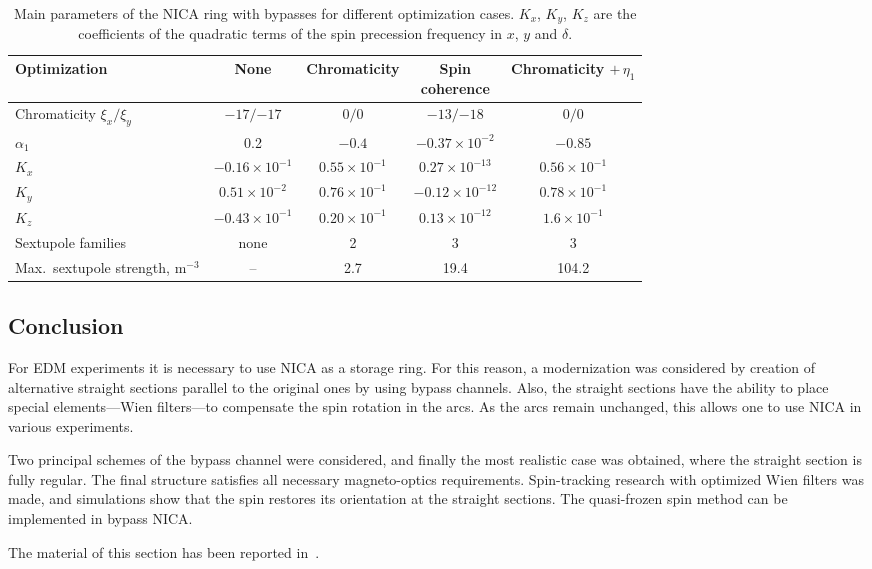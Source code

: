 \begin{table}[htbp]
  \centering
  \caption{Main parameters of the NICA ring with bypasses for different
    optimization cases. $K_x$, $K_y$, $K_z$ are the coefficients of the
    quadratic terms of the spin precession frequency in $x$, $y$ and $\delta$.}
  \label{tab:bypass_opt}
  \small
  \setlength{\tabcolsep}{3pt}
  \begin{tabular}{lcccc}
    \toprule
    Optimization & None & Chromaticity & \makecell{Spin\\coherence}
      & \makecell{Chromaticity\\$+\,\eta_1$} \\
    \midrule
    Chromaticity $\xi_x/\xi_y$ & $-17/{-17}$ & $0/0$ & $-13/{-18}$ & $0/0$ \\
    $\alpha_1$ & 0.2 & $-0.4$ & $-0.37\times10^{-2}$ & $-0.85$ \\
    $K_x$ & $-0.16\times10^{-1}$ & $0.55\times10^{-1}$ & $0.27\times10^{-13}$ & $0.56\times10^{-1}$ \\
    $K_y$ & $0.51\times10^{-2}$ & $0.76\times10^{-1}$ & $-0.12\times10^{-12}$ & $0.78\times10^{-1}$ \\
    $K_z$ & $-0.43\times10^{-1}$ & $0.20\times10^{-1}$ & $0.13\times10^{-12}$ & $1.6\times10^{-1}$ \\
    Sextupole families & none & 2 & 3 & 3 \\
    \makecell[l]{Max.\ sextupole\\strength, m$^{-3}$} & -- & 2.7 & 19.4 & 104.2 \\
    \bottomrule
  \end{tabular}
\end{table}

\subsection{Conclusion}

For EDM experiments it is necessary to use NICA as a storage ring. For this
reason, a modernization was considered by creation of alternative straight
sections parallel to the original ones by using bypass channels. Also, the
straight sections have the ability to place special elements---Wien
filters---to compensate the spin rotation in the arcs. As the arcs remain
unchanged, this allows one to use NICA in various experiments.

Two principal schemes of the bypass channel were considered, and finally the
most realistic case was obtained, where the straight section is fully regular.
The final structure satisfies all necessary magneto-optics requirements.
Spin-tracking research with optimized Wien filters was made, and simulations
show that the spin restores its orientation at the straight sections. The
quasi-frozen spin method can be implemented in bypass NICA.

The material of this section has been reported
in~\cite{Senichev:2022ide,Kolokolchikov:2023cla,Kolokolchikov:2023zpy,Kolokolchikov:2023zhf,Aksentev:2022boh,Aksentev:2023xnd,Melnikov:2023_jetpl_decoherence,Melnikov:2024gcc,Aksentev:2024tmx,Senichev:2024qtr,Senichev:2025jqf}.
